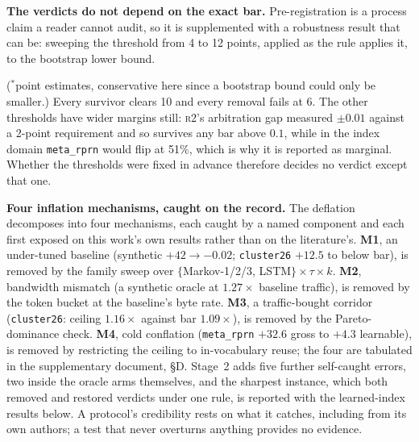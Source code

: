 \documentclass[letterpaper]{article} %
\newcommand{\rung}[1]{\textsc{#1}}
\begin{document}
\textbf{The verdicts do not depend on the exact bar.} Pre-registration is a process claim a reader cannot audit, so it is supplemented with a robustness result that can be: sweeping the threshold from 4 to 12 points, applied as the rule applies it, to the bootstrap lower bound.

\vspace{2pt}\vspace{2pt}

\noindent($^{*}$point estimates, conservative here since a bootstrap bound could only be smaller.) Every survivor clears 10 and every removal fails at 6. The other thresholds have wider margins still: \rung{r2}'s arbitration gap measured $\pm0.01$ against a 2-point requirement and so survives any bar above $0.1$, while in the index domain \texttt{meta\_rprn} would flip at 51\%, which is why it is reported as marginal. Whether the thresholds were fixed in advance therefore decides no verdict except that one.

\textbf{Four inflation mechanisms, caught on the record.} The deflation decomposes into four mechanisms, each caught by a named component and each first exposed on this work's own results rather than on the literature's. \textbf{M1}, an under-tuned baseline (synthetic $+42\to-0.02$; \texttt{cluster26} $+12.5$ to below bar), is removed by the family sweep over $\{$Markov-1/2/3, LSTM$\}\times\tau\times k$. \textbf{M2}, bandwidth mismatch (a synthetic oracle at $1.27\times$ baseline traffic), is removed by the token bucket at the baseline's byte rate. \textbf{M3}, a traffic-bought corridor (\texttt{cluster26}: ceiling $1.16\times$ against bar $1.09\times$), is removed by the Pareto-dominance check. \textbf{M4}, cold conflation (\texttt{meta\_rprn} $+32.6$ gross to $+4.3$ learnable), is removed by restricting the ceiling to in-vocabulary reuse; the four are tabulated in the supplementary document, \S D. Stage~2 adds five further self-caught errors, two inside the oracle arms themselves, and the sharpest instance, which both removed and restored verdicts under one rule, is reported with the learned-index results below. A protocol's credibility rests on what it catches, including from its own authors; a test that never overturns anything provides no evidence.
\end{document}

